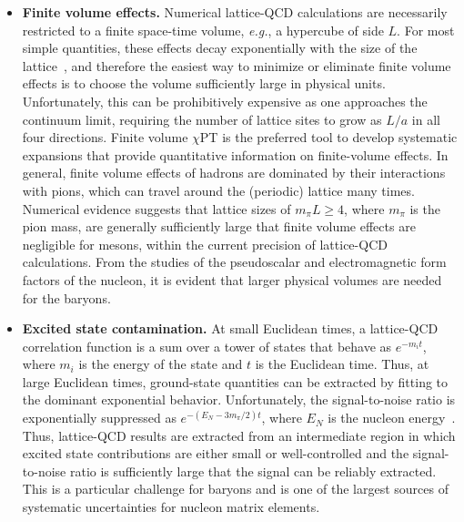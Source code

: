 \begin{itemize}
\item {\bfseries Finite volume effects.} Numerical lattice-QCD 
calculations are necessarily restricted to a finite space-time
volume, {\it e.g.}, a hypercube of side $L$.
%
For most simple quantities, these effects decay exponentially
with the size of the lattice~\cite{Luscher:1985dn,Luscher:1986pf}, and 
therefore the easiest way to
minimize or eliminate finite volume effects is to choose the volume
sufficiently large in physical units.
%
Unfortunately, this can be
prohibitively expensive as one approaches the continuum limit, requiring the
number of lattice sites to grow as $L/a$ in all four directions. 
%
Finite volume $\chi$PT is the preferred
tool to develop systematic expansions that provide quantitative
information on finite-volume effects.
%
In general, finite volume
effects of hadrons are dominated by their interactions with pions,
which can travel around the (periodic) lattice many times.
%
Numerical evidence suggests that lattice sizes of $m_\pi L \geq 4$, where
$m_\pi$ is the pion mass, are generally sufficiently large that finite
volume effects are negligible for mesons, within the current precision 
of lattice-QCD calculations.
%
From the studies of the pseudoscalar and electromagnetic form factors of the 
nucleon, it is evident that larger physical volumes are needed for the 
baryons.

\item {\bfseries Excited state contamination.} 
At small Euclidean times, a lattice-QCD correlation function
is a sum over a tower of states that behave as $e^{-m_it}$, where $m_i$ is the 
energy of the state and $t$ is the Euclidean time. 
%
Thus, at large Euclidean times,
ground-state quantities can be extracted by fitting to the dominant 
exponential behavior.
%
Unfortunately, the signal-to-noise ratio is exponentially suppressed 
as $e^{-(E_N-3m_\pi/2)t}$, where $E_N$ is the nucleon energy~\cite{Lepage:1989hd}.
%
Thus, lattice-QCD results
are extracted from an intermediate region in which excited state contributions 
are either small or well-controlled and the signal-to-noise ratio is 
sufficiently large that the signal can be reliably extracted. 
%
This is a particular challenge for baryons and is one of the largest 
sources of systematic uncertainties for nucleon matrix elements.


\end{itemize}
